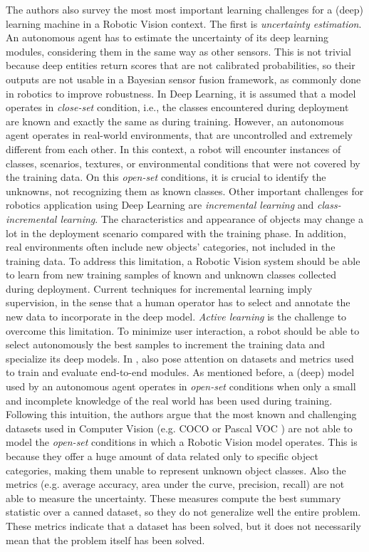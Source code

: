  The authors also survey the most most important learning challenges for a (deep) learning machine in a Robotic Vision context. The first is \textit{uncertainty estimation}. An autonomous agent has to estimate the uncertainty of its deep learning modules, considering them in the same way as other sensors. This is not trivial because deep entities return scores that are not calibrated probabilities, so their outputs are not usable in a Bayesian sensor fusion framework, as commonly done in robotics to improve robustness. In Deep Learning, it is assumed that a model operates in \textit{close-set} condition,  i.e., the classes encountered during deployment are known and exactly the same as during training. However, an autonomous agent operates in real-world environments, that are uncontrolled and extremely different from each other. In this context, a robot will encounter instances of classes, scenarios, textures, or environmental conditions that were not covered by the training data. On this \textit{open-set} conditions, it is crucial to identify the unknowns, not recognizing them as known classes. Other important challenges for robotics application using Deep Learning are \textit{incremental learning} and \textit{class-incremental learning}. The characteristics and appearance of objects may change a lot in the deployment scenario compared with the training phase. In addition, real environments often include new objects' categories, not included in the training data. To address this limitation, a Robotic Vision system should be able to learn from new training samples of known and unknown classes collected during deployment. Current techniques for incremental learning imply supervision, in the sense that a human operator has to select and annotate the new data to incorporate in the deep model. \textit{Active learning} is the challenge to overcome this limitation. To minimize user interaction, a robot should be able to select autonomously the best samples to increment the training data and specialize its deep models. In \cite{surveydeeplimits}, \citeauthor{surveydeeplimits} also pose attention on datasets and metrics used to train and evaluate end-to-end modules. As mentioned before, a (deep) model used by an autonomous agent operates in \textit{open-set} conditions when only a small and incomplete knowledge of the real world has been used during training. Following this intuition, the authors argue that the most known and challenging datasets used in Computer Vision (e.g. COCO \cite{coco} or Pascal VOC \cite{pascal}) are not able to model the \textit{open-set} conditions in which a Robotic Vision model operates. This is because they offer a huge amount of data related only to specific object categories, making them unable to represent unknown object classes. Also the metrics (e.g. average accuracy, area under the curve, precision, recall) are not able to measure the uncertainty. These measures compute the best summary statistic over a canned dataset, so they do not generalize well the entire problem. These metrics indicate that a dataset has been solved, but it does not necessarily mean that the problem itself has been solved.  
 
